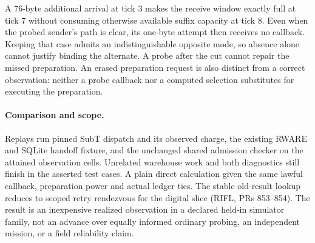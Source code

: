 \documentclass{article}
\begin{document}
A 76-byte additional arrival at tick 3 makes the receive window
exactly full at tick 7 without consuming otherwise available
suffix capacity at tick 8. Even when the probed sender's path is
clear, its one-byte attempt then receives no callback. Keeping
that case admits an indistinguishable opposite mode, so absence
alone cannot justify binding the alternate. A probe after the cut
cannot repair the missed preparation. An erased preparation request
is also distinct from a correct observation: neither a probe
callback nor a computed selection substitutes for executing the
preparation.

\paragraph{Comparison and scope.}
Replays run pinned SubT dispatch and its observed charge, the existing
RWARE and SQLite handoff fixture, and the unchanged shared admission
checker on the attained observation cells. Unrelated warehouse work
and both diagnostics still finish in the asserted test cases.
A plain direct calculation given the same lawful callback, preparation
power and actual ledger ties. The stable old-result lookup reduces
to scoped retry rendezvous for the digital slice (RIFL, PRs 853--854).
The result is an inexpensive realized observation in a declared
held-in simulator family, not an advance over equally informed
ordinary probing, an independent mission, or a field reliability
claim.
\end{document}
